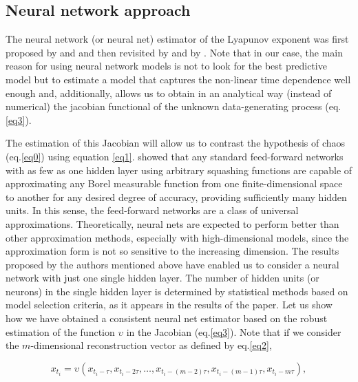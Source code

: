 \subsection{Neural network approach}

The neural network (or neural net) estimator of the Lyapunov exponent was first proposed by \cite{McCaffrey1992} and \cite{Nychka1992} and then revisited by \cite{Gencay1992} and by \cite{Shintani2003, Shintani2004}. Note that in our case, the main reason for using neural network models is not to look for the best predictive model but to estimate a model that captures the non-linear time dependence well enough and, additionally, allows us to obtain in an analytical way (instead of numerical) the jacobian functional of the unknown data-generating process (eq.\ref{eq3}). 

\newpage
The estimation of this Jacobian will allow us to contrast the hypothesis of chaos (eq.\ref{eq0}) using equation \ref{eq1}. \cite{Hornik1989} showed that any standard feed-forward networks with as few as one hidden layer using arbitrary squashing functions are capable of approximating any Borel measurable function from one finite-dimensional space to another for any desired degree of accuracy, providing sufficiently many hidden units. In this sense, the feed-forward networks are a class of universal approximations. Theoretically, neural nets are expected to perform better than other approximation methods, especially with high-dimensional models, since the approximation form is not so sensitive to the increasing dimension. The results proposed by the authors mentioned above have enabled us to consider a neural network with just one single hidden layer. The number of hidden units (or neurons) in the single hidden layer is determined by statistical methods based on model selection criteria, as it appears in the results of the paper. Let us show how we have obtained a consistent neural net estimator based on the robust estimation of the function $\upsilon$ in the Jacobian (eq.\ref{eq3}). Note that if we consider the $m$-dimensional reconstruction vector as defined by eq.\ref{eq2},

\begin{equation*}
{x_{t_i}} = \upsilon \left( {{x_{{t_i} - \tau }},{x_{{t_i} - 2\tau }}, \ldots ,{x_{{t_i} - \left( {m - 2} \right)\tau }},{x_{{t_i} - \left( {m - 1} \right)\tau }},{x_{{t_i} - m\tau }}} \right),
\end{equation*}

